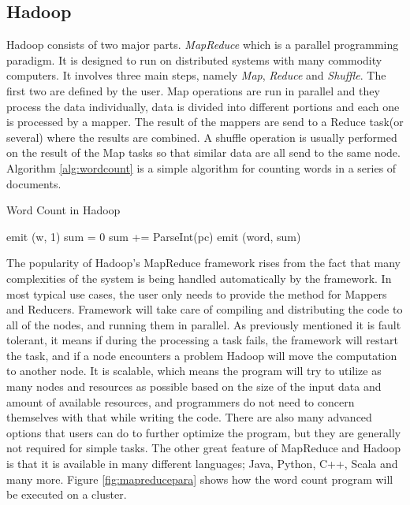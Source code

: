 \documentclass[english]{tktltiki}
\begin{document}
\subsection{Hadoop}
Hadoop consists of two major parts. 
\textit{MapReduce} which is a parallel programming paradigm. 
It is designed to run on distributed systems with many commodity computers. 
It involves three main steps, namely \textit{Map}, \textit{Reduce} and \textit{Shuffle}. 
The first two are defined by the user. 
Map operations are run in parallel and they process the data individually, data is divided into different portions and each one is processed by a mapper. 
The result of the mappers are send to a Reduce task(or several) where the results are combined. 
A shuffle operation is usually performed on the result of the Map tasks so that similar data are all send to the same node. 
Algorithm \ref{alg:wordcount} is a simple algorithm for counting words in a series of documents. 
\begin{algorithm}
\caption{Word Count in Hadoop}
\label{alg:wordcount}
\begin{algorithmic}
      		\State emit (w, 1)
   \EndFor
\EndFunction
\State 
{}
  \State sum = 0
    \State sum += ParseInt(pc)
    \State emit (word, sum)
\EndFor
\EndFunction
\end{algorithmic}
\end{algorithm}
The popularity of Hadoop's MapReduce framework rises from the fact that many complexities of the system is being handled automatically by the framework. 
In most typical use cases, the user only needs to provide the method for Mappers and Reducers. 
Framework will take care of compiling and distributing the code to all of the nodes, and running them in parallel. 
As previously mentioned it is fault tolerant, it means if during the processing a task fails, the framework will restart the task, and if a node encounters a problem Hadoop will move the computation to another node. 
It is scalable, which means the program will try to utilize as many nodes and resources as possible based on the size of the input data and amount of available resources, and programmers do not need to concern themselves with that while writing the code. 
There are also many advanced options that users can do to further optimize the program, but they are generally not required for simple tasks. The other great feature of MapReduce and Hadoop is that it is available in many different languages; Java, Python, C++, Scala and many more. 
Figure \ref{fig:mapreducepara} shows how the word count program will be executed on a cluster.
\end{document}
